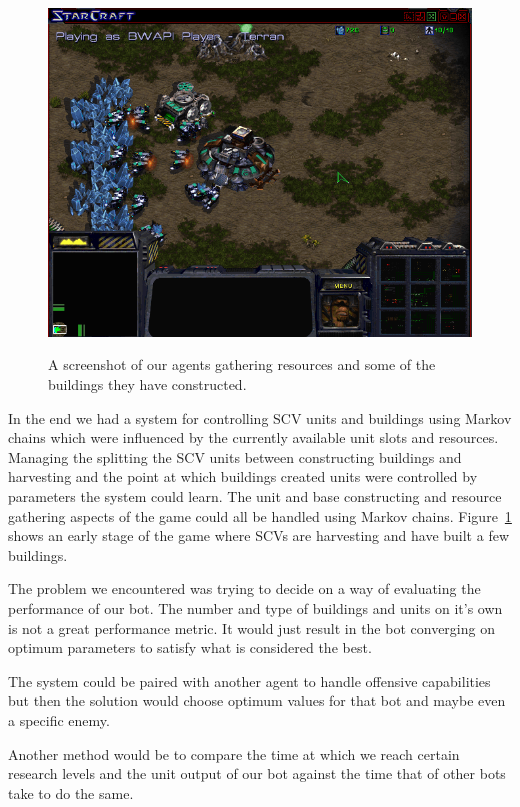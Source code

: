 
\begin{figure}[ht]
\centering
\includegraphics[scale=0.6, trim = 0cm 0cm 0cm 0.0cm]{images/Victory}
\label{fig:gameplay}
\caption{A screenshot of our agents gathering resources and some of the buildings they have constructed.}
\end{figure}


In the end we had a system for controlling SCV units and buildings using Markov chains which were influenced by the currently available unit slots and resources. Managing the splitting the SCV units between constructing buildings and harvesting and the point at which buildings created units were controlled by parameters the system could learn. The unit and base constructing and resource gathering aspects of the game could all be handled using Markov chains. Figure~\ref{fig:gameplay} shows an early stage of the game where SCVs are harvesting and have built a few buildings.


 The problem we encountered was trying to decide on a way of evaluating the performance of our bot. The number and type of buildings and units on it's own is not a great performance metric. It would just result in the bot converging on optimum parameters to satisfy what is considered the best.

 The system could be paired with another agent to handle offensive capabilities but then the solution would choose optimum values for that bot and maybe even a specific enemy.

 Another method would be to compare the time at which we reach certain research levels and the unit output of our bot against the time that of other bots take to do the same.